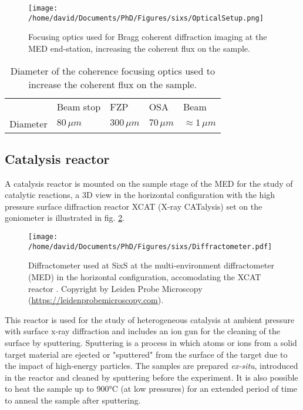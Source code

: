 \begin{figure}[!htb]
    \centering
    \texttt{[image: /home/david/Documents/PhD/Figures/sixs/OpticalSetup.png]}
    \caption{
    	Focusing optics used for Bragg coherent diffraction imaging at the MED end-station, increasing the coherent flux on the sample.
    }
    \label{fig:OpticalSetup}
\end{figure}

\begin{table}[!htb]
    \centering
	\begin{tabular}{l|l|l|l|l}
	     & Beam stop & FZP & OSA & Beam\\ \hfill
	    Diameter & $80 \, \mu m$ & $300 \, \mu m$ & $70 \, \mu m$ & $\approx 1 \, \mu m$\\
	\end{tabular}
	\caption{
	Diameter of the coherence focusing optics used to increase the coherent flux on the sample.
	}
    \label{tab:OpticsBCDI}
\end{table}

\subsection{Catalysis reactor}

A catalysis reactor is mounted on the sample stage of the MED for the study of catalytic reactions, a 3D view in the horizontal configuration with the high pressure surface diffraction reactor XCAT (X-ray CATalysis) set on the goniometer is illustrated in fig. \ref{fig:MEDDiffractometer}.

\begin{figure}[!htb]
    \centering
    \texttt{[image: /home/david/Documents/PhD/Figures/sixs/Diffractometer.pdf]}
    \caption{
    	Diffractometer used at SixS at the multi-environment diffractometer (MED) in the horizontal configuration, accomodating the XCAT reactor \parencite{VanRijn2010}.
    	Copyright by Leiden Probe Microscopy (\url{https://leidenprobemicroscopy.com}).
    }
    \label{fig:MEDDiffractometer}
\end{figure}

This reactor is used for the study of heterogeneous catalysis \parencite{VanRijn2010, Resta2020a} at ambient pressure with surface x-ray diffraction and includes an ion gun for the cleaning of the surface by sputtering.
Sputtering is a process in which atoms or ions from a solid target material are ejected or "sputtered" from the surface of the target due to the impact of high-energy particles.
The samples are prepared \textit{ex-situ}, introduced in the reactor and cleaned by sputtering before the experiment.
It is also possible to heat the sample up to 900°C (at low pressures) for an extended period of time to anneal the sample after sputtering.

